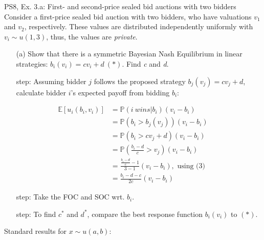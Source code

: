\begin{frame}{PS8, Ex. 3.a: First- and second-price sealed bid auctions with two bidders}
    Consider a first-price sealed bid auction with two bidders, who have valuations $v_1$ and $v_2$, respectively. These values are distributed independently uniformly with $v_i\sim u(1,3)$, thus, the values are \textit{private}.
    \vspace{-4pt}
    \begin{itemize}
      \item[(a)] Show that there is a symmetric Bayesian Nash Equilibrium in linear strategies: $b_i(v_i) = cv_i + d\ (*)$. Find \textit{c} and \textit{d}.
    \end{itemize}
    \vspace{-8pt}
    \begin{multicols}{2}
      \begin{itemize}
        \item[\nth{1} step:] Assuming bidder $j$ follows the proposed strategy $b_j(v_j) = cv_j + d$, calculate bidder $i$'s expected payoff from bidding $b_i$:
      \end{itemize}
      \vspace{-12pt}
      \begin{align*}
        \mathbb{E}[u_i(b_i,v_i)]&=\mathbb{P}(i\ wins|b_i)(v_i-b_i)\\
                                &=\mathbb{P}(b_i>b_j(v_j))(v_i-b_i)\\
                                &=\mathbb{P}(b_i>cv_j+d)(v_i-b_i)\\
                                &=\mathbb{P}\left(\frac{b_i-d}{c}>v_j\right)(v_i-b_i)\\
                                &=\frac{\frac{b_i-d}{c}-1}{3-1}(v_i-b_i),\text{ using (3)}\\
                                &=\frac{b_i-d-c}{2c}(v_i-b_i)
      \end{align*}
      \vspace{-18pt}
      \begin{itemize}
        \item[\nth{2} step:] Take the FOC and SOC wrt. $b_i$.
        \item[\nth{3} step:] To find $c^*$ and $d^*$, compare the best response function $b_i(v_i)$ to $(*)$.
      \end{itemize}
      \vfill\null\columnbreak
      Standard results for $x\sim u(a, b):$
      \vspace{-6pt}
      \begin{enumerate}

\end{enumerate}
\end{multicols}
\end{frame}
